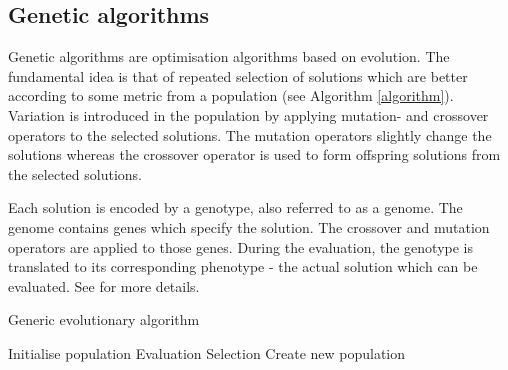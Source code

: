 \subsection{Genetic algorithms}

Genetic algorithms are optimisation algorithms based on evolution. The fundamental idea is that
of repeated selection of solutions which are better according to some metric from a population (see Algorithm \ref{algorithm}).
Variation is introduced in the population by applying mutation- and crossover operators to the
selected solutions. The mutation operators slightly change the solutions whereas the crossover
operator is used to form offspring solutions from the selected solutions.

Each solution is encoded by a genotype, also referred to as a genome. The genome contains
genes which specify the solution. The crossover and mutation operators are applied to those genes.
During the evaluation, the genotype is translated to its corresponding phenotype -
the actual solution which can be evaluated. See \cite{compint} for more details.


\begin{algorithm}[H]
    \caption{Generic evolutionary algorithm}
    \begin{algorithmic}

    \State Initialise population
        \State Evaluation 
        \State Selection  
        \State Create new population 
    \EndWhile
\EndProcedure

\end{algorithmic}
\label{algorithm}
\end{algorithm}
